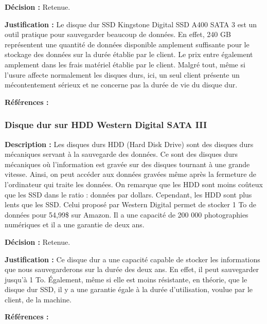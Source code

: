 \textbf{Décision :} Retenue.

\textbf{Justification :} Le disque dur SSD Kingstone Digital SSD A400 SATA 3 est un outil pratique pour sauvegarder beaucoup de données. En effet, 240 GB représentent une quantité de données disponible amplement suffisante pour le stockage des données sur la durée établie par le client. Le prix entre également amplement dans les frais matériel établie par le client. Malgré tout, même si l’usure affecte normalement les disques durs, ici, un seul client présente un mécontentement sérieux et ne concerne pas la durée de vie du disque dur.

\textbf{Références :} \cite{AMSSD} \cite{DESSD}

\subsubsection{Disque dur sur HDD Western Digital SATA III }

\textbf{Description :} Les disques durs HDD (Hard Disk Drive) sont des disques durs mécaniques servant à la sauvegarde des données. Ce sont des disques durs mécaniques où l’information est gravée sur des disques tournant à une grande vitesse. Ainsi, on peut accéder aux données gravées même après la fermeture de l’ordinateur qui traite les données. On remarque que les HDD sont moins coûteux que les SSD dans le ratio : données par dollars. Cependant, les HDD sont plus lents que les SSD. Celui proposé par Western Digital permet de stocker 1 To de données pour 54,99\$ sur Amazon. Il a une capacité de 200 000 photographies numériques et il a une garantie de deux ans. 

\textbf{Décision :} Retenue.

\textbf{Justification :} Ce disque dur a une capacité capable de stocker les informations que nous sauvegarderons sur la durée des deux ans. En effet, il peut sauvegarder jusqu’à 1 To. Également, même si elle est moins résistante, en théorie, que le disque dur SSD, il y a une garantie égale à la durée d’utilisation, voulue par le client, de la machine.

\textbf{Références :} \cite{HDD1} \cite{HDD2}

\begin{table}[!htb]
\footnotesize
\centering
{}
\caption{Évaluation globales des concepts pour le stockage de données}
\label{t:Decision_stockage}
\end{table}



